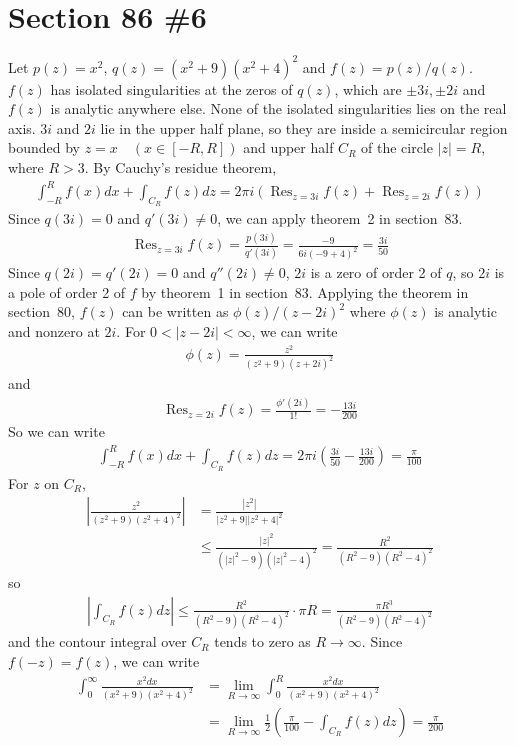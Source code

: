 \documentclass{scrartcl}
\DeclareMathOperator*{\Res}{Res}
\begin{document}
\section{Section 86 \#6}
Let \(p(z) = x^2,\, q(z) = (x^2 + 9)(x^2 + 4)^2\) and \(f(z) = p(z) / q(z)\).
\(f(z)\) has isolated singularities at the zeros of \(q(z)\), which are \(\pm 3i, \pm 2i\) and \(f(z)\) is analytic anywhere else.
None of the isolated singularities lies on the real axis.
\(3i\) and \(2i\) lie in the upper half plane, so they are inside a semicircular region bounded by \(z = x \quad (x \in [-R, R])\) and upper half \(C_R\) of the circle \(|z| = R\), where \(R > 3\).
By Cauchy's residue theorem,
\begin{align*}
  \int^R_{-R} f(x) dx + \int_{C_R} f(z) dz
  = 2\pi i \left( \Res_{z = 3i} f(z) + \Res_{z = 2i} f(z) \right)
\end{align*}
Since \(q(3i) = 0\) and \(q'(3i) \not = 0\), we can apply theorem~2 in section~83.
\begin{align*}
  \Res_{z = 3i} f(z) = \frac{p(3i)}{q'(3i)} = \frac{-9}{6i(-9 + 4)^2} = \frac{3i}{50}
\end{align*}
Since \(q(2i) = q'(2i) = 0\) and \(q''(2i) \not = 0\), \(2i\) is a zero of order 2 of \(q\), so \(2i\) is a pole of order 2 of \(f\) by theorem~1 in section~83.
Applying the theorem in section~80, \(f(z)\) can be written as \(\phi(z) / (z - 2i)^2\) where \(\phi(z)\) is analytic and nonzero at \(2i\).
For \(0 < |z - 2i| < \infty\), we can write
\begin{align*}
  \phi(z) = \frac{z^2}{(z^2 + 9)(z + 2i)^2}
\end{align*}
and
\begin{align*}
  \Res_{z = 2i} f(z) = \frac{\phi'(2i)}{1!} = -\frac{13i}{200}
\end{align*}
So we can write
\begin{align*}
  \int^R_{-R} f(x) dx + \int_{C_R} f(z) dz
  = 2\pi i \left( \frac{3i}{50} - \frac{13i}{200} \right)
  = \frac{\pi}{100}
\end{align*}
For \(z\) on \(C_R\),
\begin{align*}
  \left| \frac{z^2}{(z^2 + 9)(z^2 + 4)^2} \right|
  &= \frac{|z^2|}{|z^2 + 9||z^2 + 4|^2} \\
  &\leq \frac{|z|^2}{(|z|^2 - 9)(|z|^2 - 4)^2}
  = \frac{R^2}{(R^2 - 9)(R^2 - 4)^2}
\end{align*}
so
\begin{align*}
  \left| \int_{C_R} f(z) dz \right| \leq \frac{R^2}{(R^2 - 9)(R^2 - 4)^2} \cdot \pi R = \frac{\pi R^3}{(R^2 - 9)(R^2 - 4)^2} 
\end{align*}
and the contour integral over \(C_R\) tends to zero as \(R \to \infty\).
Since \(f(-z) = f(z)\), we can write
\begin{align*}
  \int^\infty_0 \frac{x^2 dx}{(x^2 + 9)(x^2 + 4)^2}
  &= \lim_{R \to \infty} \int^R_0 \frac{x^2 dx}{(x^2 + 9)(x^2 + 4)^2} \\
  &= \lim_{R \to \infty} \frac{1}{2} \left( \frac{\pi}{100} - \int_{C_R} f(z) dz \right)
  = \frac{\pi}{200}
\end{align*}
\end{document}
